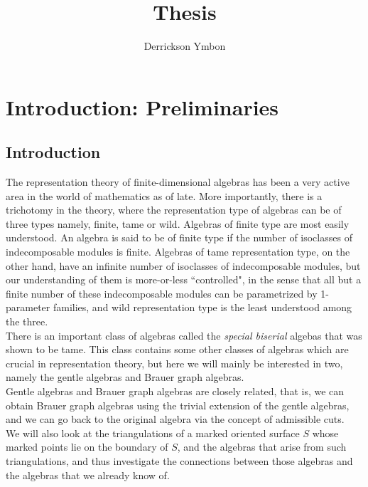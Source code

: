 \documentclass{article}
\title{Thesis}
\author{Derrickson Ymbon}
\numberwithin{figure}{section}
\begin{document}
\maketitle
\section{Introduction: Preliminaries}

\subsection{Introduction}
The representation theory of finite-dimensional algebras has been a very active area in the world of mathematics as of late. More importantly, there is a trichotomy in the theory, where the representation type of algebras can be of three types namely, finite, tame or wild. Algebras of finite type are most easily understood. An algebra is said to be of finite type if the number of isoclasses of indecomposable modules is finite. Algebras of tame representation type, on the other hand, have an infinite number of isoclasses of indecomposable modules, but our understanding of them is more-or-less ``controlled", in the sense that all but a finite number of these indecomposable modules can be parametrized by 1-parameter families, and wild representation type is the least understood among the three.\\ 

There is an important class of algebras called the \textit{special biserial} algebas that was shown to be tame\cite{Wald1985TameBA, waschbusch1983representation}. This class contains some other classes of algebras which are crucial in representation theory, but here we will mainly be interested in two, namely the gentle algebras and Brauer graph algebras\cite{schroll2017brauergraphalgebras}.\\
Gentle algebras and Brauer graph algebras are closely related, that is, we can obtain Brauer graph algebras using the trivial extension of the gentle algebras, and we can go back to the original algebra via the concept of admissible cuts.\cite{schroll2015trivialextensionsgentlealgebras} \\

We will also look at the triangulations of a marked oriented surface $S$ whose marked points lie on the boundary of $S$, and the algebras that arise from such triangulations, and thus investigate the connections between those algebras and the algebras that we already know of\cite{assem2009gentlealgebrasarisingsurface}.\\ 
\end{document}
